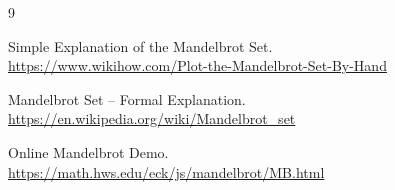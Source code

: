 \newpage
\begin{thebibliography}{9}

Simple Explanation of the Mandelbrot Set.\\
\url{https://www.wikihow.com/Plot-the-Mandelbrot-Set-By-Hand}

Mandelbrot Set – Formal Explanation.\\
\url{https://en.wikipedia.org/wiki/Mandelbrot_set}

Online Mandelbrot Demo.\\
\url{https://math.hws.edu/eck/js/mandelbrot/MB.html}

\end{thebibliography}
